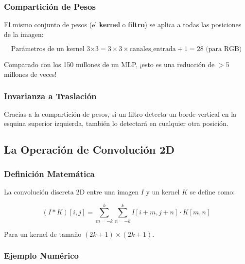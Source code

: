 \documentclass[12pt,a4paper]{article}
\begin{document}
\subsubsection{Compartición de Pesos}

El mismo conjunto de pesos (el \textbf{kernel} o \textbf{filtro}) se aplica a todas las posiciones de la imagen:

\begin{equation}
\text{Parámetros de un kernel 3×3} = 3 \times 3 \times \text{canales\_entrada} + 1 = 28 \text{ (para RGB)}
\end{equation}

Comparado con los 150 millones de un MLP, ¡esto es una reducción de $>$5 millones de veces!

\subsubsection{Invarianza a Traslación}

Gracias a la compartición de pesos, si un filtro detecta un borde vertical en la esquina superior izquierda, también lo detectará en cualquier otra posición.

\subsection{La Operación de Convolución 2D}

\subsubsection{Definición Matemática}

La convolución discreta 2D entre una imagen $I$ y un kernel $K$ se define como:

\begin{equation}
(I * K)[i,j] = \sum_{m=-k}^{k} \sum_{n=-k}^{k} I[i+m, j+n] \cdot K[m,n]
\end{equation}

Para un kernel de tamaño $(2k+1) \times (2k+1)$.

\subsubsection{Ejemplo Numérico}
\end{document}
